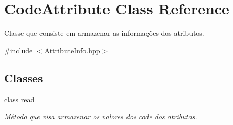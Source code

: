 \hypertarget{classCodeAttribute}{}\section{Code\+Attribute Class Reference}
\label{classCodeAttribute}


Classe que consiste em armazenar as informações dos atributos.  




{\ttfamily \#include $<$Attribute\+Info.\+hpp$>$}

\subsection*{Classes}
\begin{DoxyCompactItemize}
\item 
class \hyperlink{classCodeAttribute_1_1read}{read}
\begin{DoxyCompactList}\small\item\em Método que visa armazenar os valores dos code dos atributos. \end{DoxyCompactList}\end{DoxyCompactItemize}
